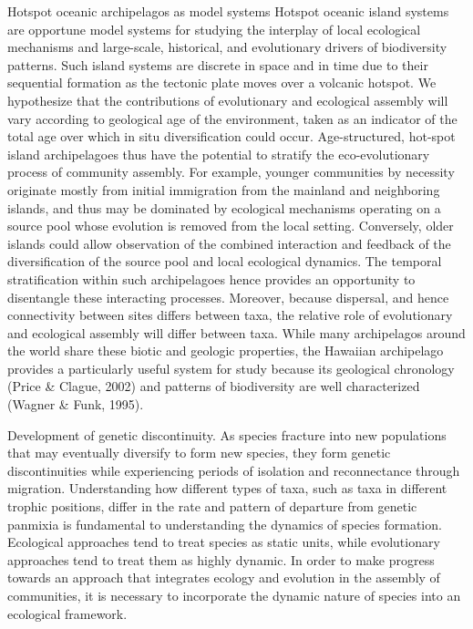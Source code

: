 \documentclass[12pt]{article}
\begin{document}
\begin{linenumbers}
Hotspot oceanic archipelagos as model systems
Hotspot oceanic island systems are opportune model systems for studying the interplay of local ecological mechanisms and large-scale, historical, and evolutionary drivers of biodiversity patterns. Such island systems are discrete in space and in time due to their sequential formation as the tectonic plate moves over a volcanic hotspot.  We hypothesize that the contributions of evolutionary and ecological assembly will vary according to geological age of the environment, taken as an indicator of the total age over which in situ diversification could occur.  Age-structured, hot-spot island archipelagoes thus have the potential to stratify the eco-evolutionary process of community assembly. 
For example, younger communities by necessity originate mostly from initial immigration from the mainland and neighboring islands, and thus may be dominated by ecological mechanisms operating on a source pool whose evolution is removed from the local setting. Conversely, older islands could allow observation of the combined interaction and feedback of the diversification of the source pool and local ecological dynamics.  The temporal stratification within such archipelagoes hence provides an opportunity to disentangle these interacting processes. Moreover, because dispersal, and hence connectivity between sites differs between taxa, the relative role of evolutionary and ecological assembly will differ between taxa. While many archipelagos around the world share these biotic and geologic properties, the Hawaiian archipelago provides a particularly useful system for study because its geological chronology (Price & Clague, 2002) and patterns of biodiversity are well characterized (Wagner & Funk, 1995).  

Development of genetic discontinuity. 
As species fracture into new populations that may eventually diversify to form new species, they form genetic discontinuities while experiencing periods of isolation and reconnectance through migration. Understanding how different types of taxa, such as taxa in different trophic positions, differ in the rate and pattern of departure from genetic panmixia is fundamental to understanding the dynamics of species formation. Ecological approaches tend to treat species as static units, while evolutionary approaches tend to treat them as highly dynamic. In order to make progress towards an approach that integrates ecology and evolution in the assembly of communities, it is necessary to incorporate the dynamic nature of species into an ecological framework.   


\end{linenumbers}
\end{document}
